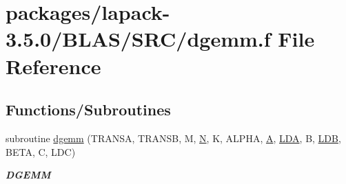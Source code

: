 \hypertarget{lapack-3_85_80_2BLAS_2SRC_2dgemm_8f}{}\section{packages/lapack-\/3.5.0/\+B\+L\+A\+S/\+S\+R\+C/dgemm.f File Reference}
\label{lapack-3_85_80_2BLAS_2SRC_2dgemm_8f}
\subsection*{Functions/\+Subroutines}
\begin{DoxyCompactItemize}
\item 
subroutine \hyperlink{group__double__blas__level3_gaeda3cbd99c8fb834a60a6412878226e1}{dgemm} (T\+R\+A\+N\+S\+A, T\+R\+A\+N\+S\+B, M, \hyperlink{polmisc_8c_a0240ac851181b84ac374872dc5434ee4}{N}, K, A\+L\+P\+H\+A, \hyperlink{classA}{A}, \hyperlink{example__user_8c_ae946da542ce0db94dced19b2ecefd1aa}{L\+D\+A}, B, \hyperlink{example__user_8c_a50e90a7104df172b5a89a06c47fcca04}{L\+D\+B}, B\+E\+T\+A, C, L\+D\+C)
\begin{DoxyCompactList}\small\item\em {\bfseries D\+G\+E\+M\+M} \end{DoxyCompactList}\end{DoxyCompactItemize}
